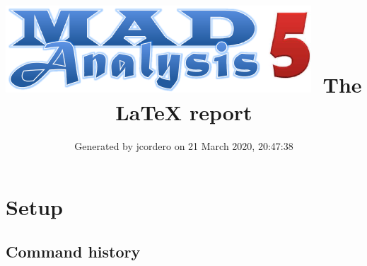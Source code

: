 \documentclass[a4paper, 10pt]{article}
\title{{\includegraphics[scale=.4]{logo.png}}\ The LaTeX report}
\author{Generated by jcordero on 21 March 2020, 20:47:38}
\begin{document}
\maketitle
\flushbottom

\newpage
\section{ Setup}

\subsection{ Command history}
\end{document}
